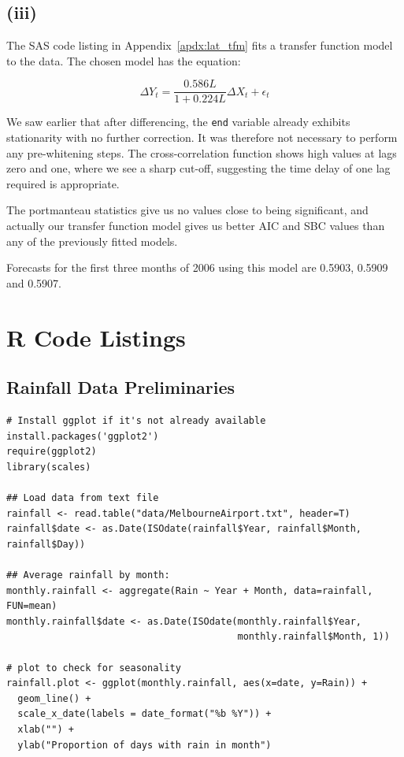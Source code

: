 \documentclass{article}
\begin{document}
\begin{appendices}

\subsection*{(iii)}

The SAS code listing in Appendix~\ref{apdx:lat_tfm} fits a transfer
function model to the data. The chosen model has the equation:

\[
  \Delta Y_t = \frac{0.586L}{1 + 0.224L} \Delta X_t + \epsilon_t
\]

We saw earlier that after differencing, the \texttt{end} variable
already exhibits stationarity with no further correction. It was
therefore not necessary to perform any pre-whitening steps. The
cross-correlation function shows high values at lags zero and one,
where we see a sharp cut-off, suggesting the time delay of one lag
required is appropriate.

The portmanteau statistics give us no values close to being
significant, and actually our transfer function model gives us better
AIC and SBC values than any of the previously fitted models.

Forecasts for the first three months of 2006 using this model are
0.5903, 0.5909 and 0.5907.

\section{R Code Listings}

\subsection{Rainfall Data Preliminaries}\label{apdx:rainfall_preliminary}

\begin{verbatim}
# Install ggplot if it's not already available
install.packages('ggplot2')
require(ggplot2)
library(scales)

## Load data from text file
rainfall <- read.table("data/MelbourneAirport.txt", header=T)
rainfall$date <- as.Date(ISOdate(rainfall$Year, rainfall$Month, rainfall$Day))

## Average rainfall by month:
monthly.rainfall <- aggregate(Rain ~ Year + Month, data=rainfall, FUN=mean)
monthly.rainfall$date <- as.Date(ISOdate(monthly.rainfall$Year,
                                         monthly.rainfall$Month, 1))

# plot to check for seasonality
rainfall.plot <- ggplot(monthly.rainfall, aes(x=date, y=Rain)) +
  geom_line() +
  scale_x_date(labels = date_format("%b %Y")) +
  xlab("") +
  ylab("Proportion of days with rain in month")


\end{verbatim}
\end{appendices}
\end{document}
